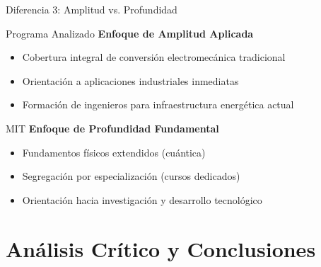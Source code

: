\documentclass[aspectratio=43]{beamer}
\begin{document}
  \begin{frame}{Diferencia 3: Amplitud vs. Profundidad}
  
  \begin{block}{Programa Analizado}
  \textbf{Enfoque de Amplitud Aplicada}
  \begin{itemize}
  \item Cobertura integral de conversión electromecánica tradicional
  \item Orientación a aplicaciones industriales inmediatas
  \item Formación de ingenieros para infraestructura energética actual
  \end{itemize}
  \end{block}
  
  \begin{block}{MIT}
  \textbf{Enfoque de Profundidad Fundamental}
  \begin{itemize}
  \item Fundamentos físicos extendidos (cuántica)
  \item Segregación por especialización (cursos dedicados)
  \item Orientación hacia investigación y desarrollo tecnológico
  \end{itemize}
  \end{block}
  
  \end{frame}
  
  \section{Análisis Crítico y Conclusiones}
  
\end{document}

